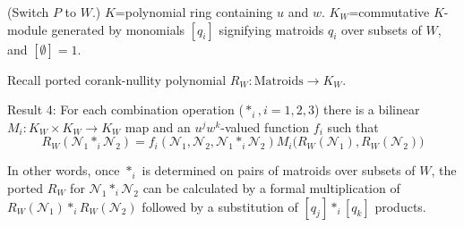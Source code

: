 \documentclass[%
  slidesonly,%
  semlayer,%
  amsmath
  ]{seminar}                                  %
\begin{document}
\begin{slide}
(Switch $P$ to $W$.)
$K$=polynomial ring containing $u$ and $w$.  
$K_W$=commutative $K$-module generated by monomials
$[q_i]$ signifying matroids $q_i$ over subsets of $W$, and $[\emptyset]=1$.

Recall ported corank-nullity polynomial $R_W:\text{Matroids}\rightarrow K_W$.

Result 4:  For each combination operation ($*_i,i=1,2,3$) there is a bilinear 
$M_i:K_W\times K_W\rightarrow K_W$ map and an $u^jw^k$-valued function $f_i$ such 
that 
\[
R_W(\mathcal{N}_1 *_i \mathcal{N}_2) =
f_i(\mathcal{N}_1,\mathcal{N}_2,\mathcal{N}_1*_i\mathcal{N}_2)
M_i\big(R_W(\mathcal{N}_1),R_W(\mathcal{N}_2)\big)
\]

In other words, once $*_i$ is determined on pairs of matroids over subsets of $W$,
the ported $R_W$ for $\mathcal{N}_1*_i\mathcal{N}_2$ can be calculated by
a formal multiplication of $R_W(\mathcal{N}_1)*_iR_W(\mathcal{N}_2)$ followed
by a substitution of $[q_j]*_i[q_k]$ products.

\end{slide}
\end{document}

